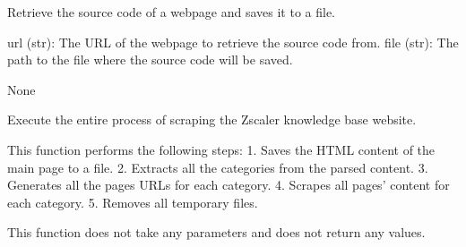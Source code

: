 \documentclass[letterpaper,10pt,english]{sphinxmanual}
\begin{document}
\begin{fulllineitems}
\label{\detokenize{Project.Script:Project.Script.RecupKbZscaler.getSourceCode}}
\pysigstartsignatures
{}
\pysigstopsignatures
\sphinxAtStartPar
Retrieve the source code of a webpage and saves it to a file.
\begin{description}
\sphinxAtStartPar
url (str): The URL of the webpage to retrieve the source code from.
file (str): The path to the file where the source code will be saved.

\sphinxAtStartPar
None

\end{description}

\end{fulllineitems}


\begin{fulllineitems}
\label{\detokenize{Project.Script:Project.Script.RecupKbZscaler.main}}
\pysigstartsignatures
{}
\pysigstopsignatures
\sphinxAtStartPar
Execute the entire process of scraping the Zscaler knowledge base website.

\sphinxAtStartPar
This function performs the following steps:
1. Saves the HTML content of the main page to a file.
2. Extracts all the categories from the parsed content.
3. Generates all the pages URLs for each category.
4. Scrapes all pages’ content for each category.
5. Removes all temporary files.

\sphinxAtStartPar
This function does not take any parameters and does not return any values.

\end{fulllineitems}

\end{document}
